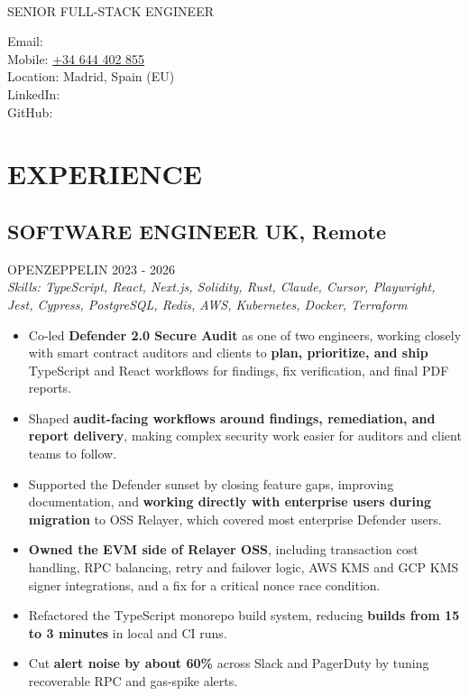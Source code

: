 \documentclass{article}
\newcommand{\WorkExperience}[2]{
   \subsection*{#1}
   \vspace{-1em}
   \uppercase{#2}
}
\newcommand{\Skills}[1]{
   \textit{Skills: #1}
}
\begin{document}
\begin{center}
	\begin{minipage}{0.5\textwidth}
		{\fontsize{24}{28}\Title{}} \\
		\bigskip
		{\normalsize \MakeUppercase{Senior Full-Stack Engineer}}
	\end{minipage} \hfill
	\begin{minipage}{0.4\textwidth}
		\raggedleft{}
		Email: \href{mailto:\ResumeEmail}{\ResumeEmail} \\
		Mobile: \href{tel:+34644402855}{+34 644 402 855}  \\
		Location: Madrid, Spain (EU) \\
		LinkedIn: \href{\ResumeLinkedInUrl}{\ResumeLinkedInLabel} \\
		GitHub: \href{\ResumeGitHubUrl}{\ResumeGitHubLabel}
	\end{minipage}
\end{center}

\vspace{-3em}

\phantom{Amazon, Microsoft, Facebook} %

\section*{EXPERIENCE}
\WorkExperience{SOFTWARE ENGINEER \hfill UK, Remote}{OpenZeppelin \hfill 2023 {-} 2026} \\
\Skills{TypeScript, React, Next.js, Solidity, Rust, Claude, Cursor, Playwright, Jest, Cypress, PostgreSQL, Redis, AWS, Kubernetes, Docker, Terraform}
\begin{itemize}
	\item Co-led \textbf{Defender 2.0 Secure Audit} as one of two engineers, working closely with smart contract auditors and clients to \textbf{plan, prioritize, and ship} TypeScript and React workflows for findings, fix verification, and final PDF reports.
	\item Shaped \textbf{audit-facing workflows around findings, remediation, and report delivery}, making complex security work easier for auditors and client teams to follow.
	\item Supported the Defender sunset by closing feature gaps, improving documentation, and \textbf{working directly with enterprise users during migration} to OSS Relayer, which covered most enterprise Defender users.
	\item \textbf{Owned the EVM side of Relayer OSS}, including transaction cost handling, RPC balancing, retry and failover logic, AWS KMS and GCP KMS signer integrations, and a fix for a critical nonce race condition.
	\item Refactored the TypeScript monorepo build system, reducing \textbf{builds from 15 to 3 minutes} in local and CI runs.
	\item Cut \textbf{alert noise by about 60\%} across Slack and PagerDuty by tuning recoverable RPC and gas-spike alerts.
\end{itemize}
\end{document}
